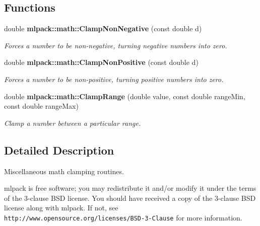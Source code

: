 \subsection*{Functions}
\begin{DoxyCompactItemize}
\item 
double {\bf mlpack\+::math\+::\+Clamp\+Non\+Negative} (const double d)
\begin{DoxyCompactList}\small\item\em Forces a number to be non-\/negative, turning negative numbers into zero. \end{DoxyCompactList}\item 
double {\bf mlpack\+::math\+::\+Clamp\+Non\+Positive} (const double d)
\begin{DoxyCompactList}\small\item\em Forces a number to be non-\/positive, turning positive numbers into zero. \end{DoxyCompactList}\item 
double {\bf mlpack\+::math\+::\+Clamp\+Range} (double value, const double range\+Min, const double range\+Max)
\begin{DoxyCompactList}\small\item\em Clamp a number between a particular range. \end{DoxyCompactList}\end{DoxyCompactItemize}


\subsection{Detailed Description}
Miscellaneous math clamping routines. 

mlpack is free software; you may redistribute it and/or modify it under the terms of the 3-\/clause B\+SD license. You should have received a copy of the 3-\/clause B\+SD license along with mlpack. If not, see {\tt http\+://www.\+opensource.\+org/licenses/\+B\+S\+D-\/3-\/\+Clause} for more information. 